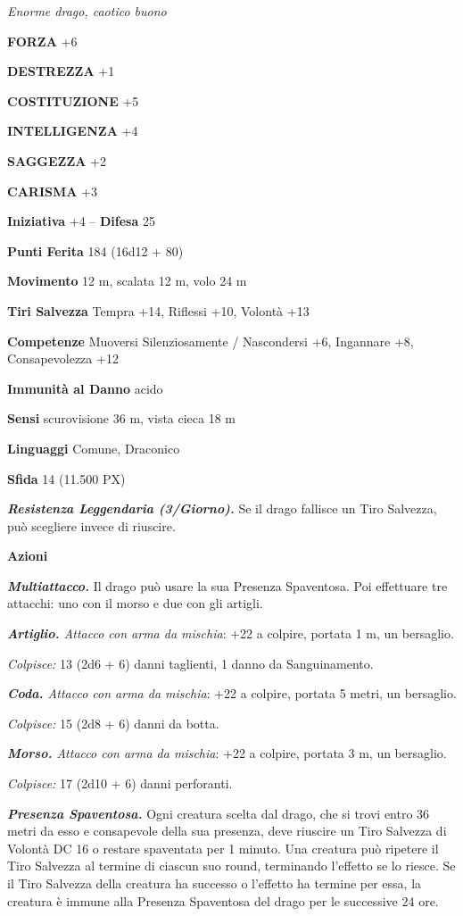 \begin{multicols}{2}
	\textit{Enorme drago, caotico buono}

	\textbf{FORZA} +6

	\textbf{DESTREZZA} +1

	\textbf{COSTITUZIONE} +5

	\textbf{INTELLIGENZA} +4

	\textbf{SAGGEZZA} +2

	\textbf{CARISMA} +3

	\textbf{Iniziativa} +4 -- \textbf{Difesa} 25

	\textbf{Punti Ferita} 184 (16d12 + 80)

	\textbf{Movimento} 12 m, scalata 12 m, volo 24 m

	\textbf{Tiri Salvezza} Tempra +14, Riflessi +10, Volontà +13

	\textbf{Competenze} Muoversi Silenziosamente / Nascondersi +6, Ingannare +8, Consapevolezza +12

	\textbf{Immunità al Danno} acido

	\textbf{Sensi} scurovisione 36 m, vista cieca 18 m

	\textbf{Linguaggi} Comune, Draconico

	\textbf{Sfida} 14 (11.500 PX)

	\textit{\textbf{Resistenza Leggendaria (3/Giorno).}} Se il drago fallisce un Tiro Salvezza, può scegliere invece di riuscire.

	\textbf{Azioni}

	\textit{\textbf{Multiattacco.}} Il drago può usare la sua Presenza Spaventosa. Poi effettuare tre attacchi: uno con il morso e due con gli artigli.

	\textit{\textbf{Artiglio.} Attacco con arma da mischia}: +22 a colpire, portata 1 m, un bersaglio.

	\textit{Colpisce:} 13 (2d6 + 6) danni taglienti, 1 danno da Sanguinamento.

	\textit{\textbf{Coda.} Attacco con arma da mischia}: +22 a colpire, portata 5 metri, un bersaglio.

	\textit{Colpisce:} 15 (2d8 + 6) danni da botta.

	\textit{\textbf{Morso.} Attacco con arma da mischia}: +22 a colpire, portata 3 m, un bersaglio.

	\textit{Colpisce:} 17 (2d10 + 6) danni perforanti.

	\textit{\textbf{Presenza Spaventosa.}} Ogni creatura scelta dal drago, che si trovi entro 36 metri da esso e consapevole della sua presenza, deve riuscire un Tiro Salvezza di Volontà DC 16 o restare spaventata per 1 minuto. Una creatura può ripetere il Tiro Salvezza al termine di ciascun suo round, terminando l'effetto se lo riesce. Se il Tiro Salvezza della creatura ha successo o l'effetto ha termine per essa, la creatura è immune alla Presenza Spaventosa del drago per le successive 24 ore.


\end{multicols}
